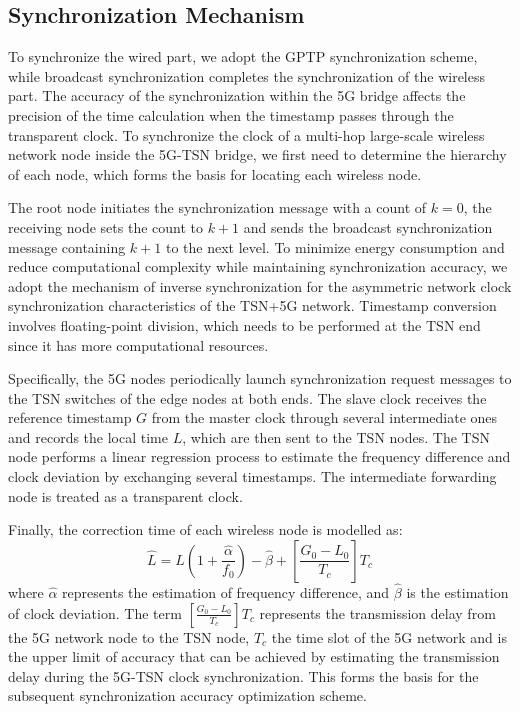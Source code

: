 \documentclass[english]{cccconf}
\begin{document}
\subsection{Synchronization Mechanism}
To synchronize the wired part, we adopt the GPTP synchronization scheme, while broadcast synchronization completes the synchronization of the wireless part. The accuracy of the synchronization within the 5G bridge affects the precision of the time calculation when the timestamp passes through the transparent clock. To synchronize the clock of a multi-hop large-scale wireless network node inside the 5G-TSN bridge, we first need to determine the hierarchy of each node, which forms the basis for locating each wireless node.

The root node initiates the synchronization message with a count of $k=0$, the receiving node sets the count to $k+1$ and sends the broadcast synchronization message containing $k+1$ to the next level. To minimize energy consumption and reduce computational complexity while maintaining synchronization accuracy, we adopt the mechanism of inverse synchronization for the asymmetric network clock synchronization characteristics of the TSN+5G network\cite{8935413}. Timestamp conversion involves floating-point division, which needs to be performed at the TSN end since it has more computational resources.

Specifically, the 5G nodes periodically launch synchronization request messages to the TSN switches of the edge nodes at both ends. The slave clock receives the reference timestamp $G$ from the master clock through several intermediate ones and records the local time $L$, which are then sent to the TSN nodes. The TSN node performs a linear regression process to estimate the frequency difference and clock deviation by exchanging several timestamps. The intermediate forwarding node is treated as a transparent clock.

Finally, the correction time of each wireless node is modelled as:
\begin{equation}
	\widehat{L}=L\left(1+\frac{\widehat{\alpha}}{f_0}\right)-\widehat{\beta}+\left[\frac{G_0-L_0}{T_c}\right] T_c
\end{equation}
where $\widehat{\alpha}$ represents the estimation of frequency difference, and $\widehat{\beta}$ is the estimation of clock deviation. The term $[\frac{G_0-L_0}{T_c}] T_c$ represents the transmission delay from the 5G network node to the TSN node, $T_c$ the time slot of the 5G network and is the upper limit of accuracy that can be achieved by estimating the transmission delay during the 5G-TSN clock synchronization. This forms the basis for the subsequent synchronization accuracy optimization scheme.
\end{document}
